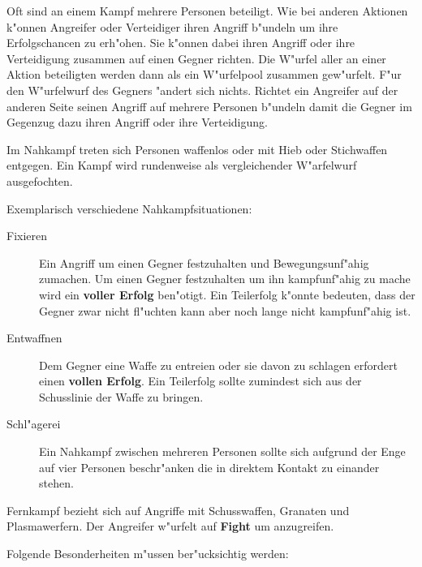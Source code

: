Oft sind an einem Kampf mehrere Personen beteiligt. Wie bei anderen Aktionen k"onnen Angreifer oder Verteidiger ihren Angriff b"undeln um ihre Erfolgschancen zu erh"ohen. Sie k"onnen dabei ihren Angriff oder ihre Verteidigung zusammen auf einen Gegner richten. Die W"urfel aller an einer Aktion beteiligten werden dann als ein W"urfelpool zusammen gew"urfelt. F"ur den W"urfelwurf des Gegners "andert sich nichts. Richtet ein Angreifer auf der anderen Seite seinen Angriff auf mehrere Personen b"undeln damit die Gegner im Gegenzug dazu ihren Angriff oder ihre Verteidigung.

Im Nahkampf treten sich Personen waffenlos oder mit Hieb oder Stichwaffen entgegen. Ein Kampf wird rundenweise als vergleichender W"arfelwurf ausgefochten.

Exemplarisch verschiedene Nahkampfsituationen:

\begin{description}
    \item[Fixieren] Ein Angriff um einen Gegner festzuhalten und Bewegungsunf"ahig zumachen. Um einen Gegner festzuhalten um ihn    
        kampfunf"ahig zu mache wird ein \textbf{voller Erfolg} ben"otigt. Ein Teilerfolg k"onnte bedeuten, dass der Gegner zwar nicht fl"uchten kann aber noch lange nicht kampfunf"ahig ist.
    \item[Entwaffnen] Dem Gegner eine Waffe zu entrei\3en oder sie davon zu schlagen erfordert einen \textbf{vollen Erfolg}. Ein Teilerfolg 
        sollte zumindest sich aus der Schusslinie der Waffe zu bringen.
    \item[Schl"agerei] Ein Nahkampf zwischen mehreren Personen sollte sich aufgrund der Enge auf vier Personen beschr"anken die in direktem 
        Kontakt zu einander stehen.
\end{description}


Fernkampf bezieht sich auf Angriffe mit Schusswaffen, Granaten und Plasmawerfern. Der Angreifer w"urfelt auf \textbf{Fight} um anzugreifen.

Folgende Besonderheiten m"ussen ber"ucksichtig werden:


